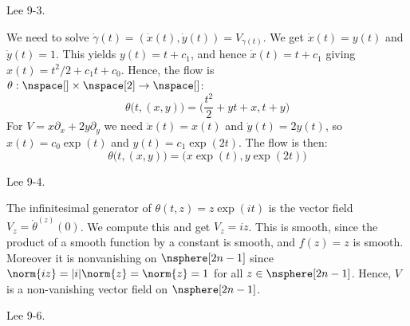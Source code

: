    \begin{problem}
        Lee 9-3.
    \end{problem}
    \begin{solution}
        We need to solve
        $\dot{\gamma}(t)=(\dot{x}(t),\dot{y}(t))=V_{\gamma(t)}$. We get
        $\dot{x}(t)=y(t)$ and $\dot{y}(t)=1$. This yields
        $y(t)=t+c_{1}$, and hence $\dot{x}(t)=t+c_{1}$ giving
        $x(t)=t^{2}/2+c_{1}t+c_{0}$. Hence, the flow is
        $\theta:\nspace[]\times\nspace[2]\rightarrow\nspace[]$:
        \begin{equation}
            \theta\big(t,(x,y)\big)=\Big(\frac{t^{2}}{2}+yt+x,t+y\Big)
        \end{equation}
        For $V=x\partial_{x}+2y\partial_{y}$ we need
        $\dot{x}(t)=x(t)$ and $\dot{y}(t)=2y(t)$, so
        $x(t)=c_{0}\exp(t)$ and $y(t)=c_{1}\exp(2t)$. The flow is then:
        \begin{equation}
            \theta\big(t,(x,y)\big)=\big(x\exp(t),y\exp(2t)\big)
        \end{equation}
    \end{solution}
    \begin{problem}
        Lee 9-4.
    \end{problem}
    \begin{solution}
        The infinitesimal generator of $\theta(t,z)=z\exp(it)$ is the
        vector field $V_{z}=\dot{\theta}^{(z)}(0)$. We compute this and
        get $V_{z}=iz$. This is smooth, since the product of a smooth
        function by a constant is smooth, and $f(z)=z$ is smooth. Moreover
        it is nonvanishing on $\nsphere[2n-1]$ since
        $\norm{iz}=|i|\norm{z}=\norm{z}=1$ for all $z\in\nsphere[2n-1]$.
        Hence, $V$ is a non-vanishing vector field on $\nsphere[2n-1]$.
    \end{solution}
    \begin{problem}
        Lee 9-6.
    \end{problem}
